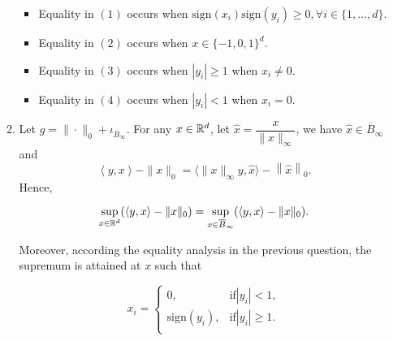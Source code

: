 \begin{enumerate}
\begin{enumerate}[label=(\alph*)]
                \begin{itemize}
                  \item Equality in $(1)$ occurs when $\mathrm{sign}(x_i)\mathrm{sign}(y_i) \ge 0, \forall i\in\{1,\ldots, d\}$.
                  \item Equality in $(2)$ occurs when $x \in \{-1,0,1\}^d$.
                  \item Equality in $(3)$ occurs when $|y_i| \ge 1$ when $x_i \ne 0$.
                  \item Equality in $(4)$ occurs when $|y_i| < 1$ when $x_i = 0$.
                \end{itemize}



          \item Let $g= \|\cdot\|_0 + \iota_{\overline{B}_{\infty}}$. For any $x\in{\mathbb{R}}^d$, let $\hat{x}= \dfrac{x}{\|x\|_{\infty}}$, we have $\hat{x}\in \overline{B}_{\infty}$ and            $$\left\langle y,x\right\rangle - \|x\|_0 = \langle \|x\|_{\infty} y, \hat{x}\rangle - \left\|\hat{x}\right\|_0.$$ Hence,

                $$ \sup\limits_{x\in{\mathbb{R}}^d} (\langle y,x\rangle - \|x\|_0) = \sup\limits_{x\in\overline{B}_{\infty}} (\langle y,x\rangle - \|x\|_0).$$

                Moreover, according the equality analysis in the previous question, the supremum is attained at $x$ such that

                $$
                  x_i = \begin{cases}
                    0,                  & \mathrm{if } |y_i| < 1,   \\
                    \mathrm{sign}(y_i), & \mathrm{if } |y_i| \ge 1. \\
                  \end{cases}
                $$


\end{enumerate}
\end{enumerate}
